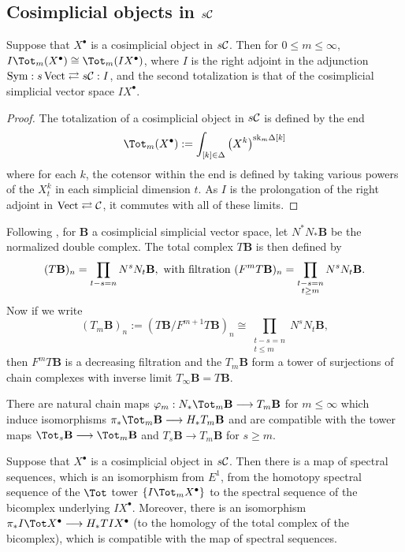 \documentclass[10pt]{article}
\newcommand{\Comm}{\calC}
\begin{document}
\begin{TotalisationInSAlg}
\subsection{Cosimplicial objects in $s\Comm$}
\begin{prop}
Suppose that $X^\bullet$ is a cosimplicial object in $s\Comm$. Then for $0\leq m\leq\infty$, $I\Tot_m(X^\bullet)\cong\Tot_m(IX^\bullet)$, where $I$ is the right adjoint in the adjunction $\textup{Sym}:s\Vect\rightleftarrows s\Comm:I$, and the second totalization is that of the cosimplicial simplicial vector space $IX^\bullet$.
\end{prop}
\begin{proof}
The totalization of a cosimplicial object in $s\Comm$ is defined by the end
\[\Tot_m(X^\bullet):= \int_{[k]\in\Delta} \left(X^k\right)^{\textup{sk}_m\Delta[k]}\]
where for each $k$, the cotensor within the end is defined by taking various powers of the $X^k_t$ in each simplicial dimension $t$. As $I$ is the prolongation of the right adjoint in $\Vect\rightleftarrows\Comm$, it commutes with all of these limits.
\end{proof}
Following \cite{BousfieldHSSCS.pdf}, for $\textbf{B}$ a cosimplicial simplicial vector space, let $N^*N_*\textbf{B}$ be the normalized double complex. The total complex $T\textbf{B}$ is then defined by
\[(T\textbf{B})_n=\prod_{t-s=n}N^sN_t\textbf{B},\ \textup{with filtration }(F^mT\textbf{B})_n=\prod_{\substack{t-s=n\\t\geq m}}N^sN_t\textbf{B}.\]
Now if we write
\[(T_m\textbf{B})_n:=(T\textbf{B}/F^{m+1} T\textbf{B})_n\cong\prod_{\substack{t-s=n\\t\leq m}}N^sN_t\textbf{B}, \]
then $F^mT\textbf{B}$ is a decreasing filtration and the $T_m\textbf{B}$ form a tower of surjections of chain complexes with inverse limit $T_\infty\textbf{B}=T\textbf{B}$. 
\begin{lem}
There are natural chain maps $\phi_m:N_*\Tot_m\textbf{B}\to T_m\textbf{B}$ for $m\leq\infty$ which induce isomorphisms $\pi_*\Tot_m\textbf{B}\to H_*T_m\textbf{B}$ and are compatible with the tower maps $\Tot_{s}\textbf{B}\to\Tot_m\textbf{B}$ and $T_{s}\textbf{B}\to T_m\textbf{B}$ for $s\geq m$.
\end{lem}
\begin{cor}
Suppose that $X^\bullet$ is a cosimplicial object in $s\Comm$. Then there is a map of spectral sequences, which is an isomorphism from $E^1$, from the homotopy spectral sequence of the $\Tot$ tower $\{I\Tot_mX^\bullet\}$ to the spectral sequence of the bicomplex underlying $IX^\bullet$. Moreover, there is an isomorphism $\pi_*I\Tot X^\bullet\to H_*TIX^\bullet$ (to the homology of the total complex of the bicomplex), which is compatible with the map of spectral sequences.

\end{cor}
\end{TotalisationInSAlg}
\end{document}
